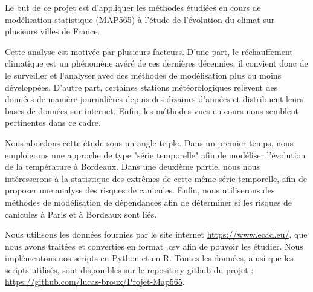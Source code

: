 \documentclass[../report.tex]{subfiles}
\begin{document}
\par Le but de ce projet est d'appliquer les méthodes étudiées en cours de modélisation statistique (MAP565) à l'étude de l'évolution du climat sur plusieurs villes de France.

\par Cette analyse est motivée par plusieurs facteurs. D'une part, le réchauffement climatique est un phénomène avéré de ces dernières décennies; il convient donc de le surveiller et l'analyser avec des méthodes de modélisation plus ou moins développées. D'autre part, certaines stations météorologiques relèvent des données de manière journalières depuis des dizaines d'années et distribuent leurs bases de données sur internet. Enfin, les méthodes vues en cours nous semblent pertinentes dans ce cadre.

\par Nous abordons cette étude sous un angle triple.
Dans un premier temps, nous emploierons une approche de type "série temporelle" afin de modéliser l'évolution de la température à Bordeaux.
Dans une deuxième partie, nous nous intéresserons à la statistique des extrêmes de cette même série temporelle, afin de proposer une analyse des risques de canicules.
Enfin, nous utiliserons des méthodes de modélisation de dépendances afin de déterminer si les risques de canicules à Paris et à Bordeaux sont liés.

\par Nous utilisons les données fournies par le site internet \url{https://www.ecad.eu/}, que nous avons traitées et converties en format .csv afin de pouvoir les étudier. 
Nous implémentons nos scripts en Python et en R.
Toutes les données, ainsi que les scripts utilisés, sont disponibles sur le repository github du projet : \url{https://github.com/lucas-broux/Projet-Map565}.
\end{document}
